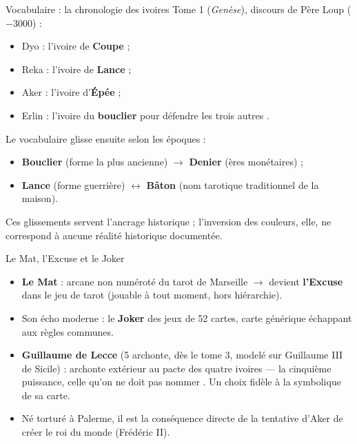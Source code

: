 \documentclass[11pt]{beamer}
\begin{document}
\begin{frame}{Vocabulaire : la chronologie des ivoires}
Tome 1 (\emph{Genèse}), discours de Père Loup ($-3000$) :
\begin{itemize}
\item Dyo : l'ivoire de \textbf{Coupe} ;
\item Reka : l'ivoire de \textbf{Lance} ;
\item Aker : l'ivoire d'\textbf{Épée} ;
\item Erlin : \og l'ivoire du \textbf{bouclier} pour défendre les trois autres \fg{}.
\end{itemize}
\vspace{0.4em}
Le vocabulaire glisse ensuite selon les époques :
\begin{itemize}
\item \textbf{Bouclier} (forme la plus ancienne) $\rightarrow$ \textbf{Denier}
(ères monétaires) ;
\item \textbf{Lance} (forme guerrière) $\leftrightarrow$ \textbf{Bâton}
(nom tarotique traditionnel de la maison).
\end{itemize}
Ces glissements servent l'ancrage historique ; l'inversion des couleurs,
elle, ne correspond à aucune réalité historique documentée.
\end{frame}

\begin{frame}{Le Mat, l'Excuse et le Joker}
\begin{itemize}
\item \textbf{Le Mat} : arcane non numéroté du tarot de Marseille
$\rightarrow$ devient \textbf{l'Excuse} dans le jeu de tarot
(jouable à tout moment, hors hiérarchie).
\item Son écho moderne : le \textbf{Joker} des jeux de 52 cartes,
carte \og générique \fg{} échappant aux règles communes.
\item \textbf{Guillaume de Lecce} (5\ieme{} archonte, dès le tome 3, modelé
sur Guillaume III de Sicile) : archonte extérieur au pacte des quatre
ivoires --- \og la cinquième puissance, celle qu'on ne doit pas nommer \fg{}.
Un choix fidèle à la symbolique de sa carte.
\item Né torturé à Palerme, il est la \og conséquence directe \fg{} de la
tentative d'Aker de créer le \og roi du monde \fg{} (Frédéric II).
\end{itemize}
\end{frame}
\end{document}
